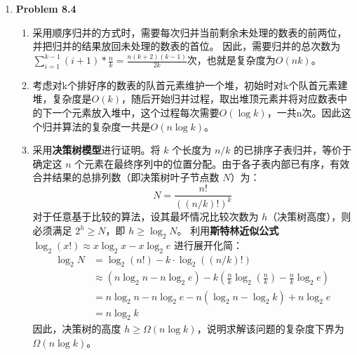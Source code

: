 \documentclass{ctexart}
\begin{document}
\begin{enumerate}[label=\arabic*.]
\begin{enumerate}[label=(\arabic*)]
\begin{algorithm}[H]
                $sum \leftarrow a_n$\;
                \Return $sum$\;
            \end{algorithm}
            \item 如果存在一个算法，其复杂度为$o(n)$，那么其必然不能遍历多项式的全部$n+1$项。那么我们就可以随意改动没遍历到的这一项的系数，使得这个算法无法输出正确的多项式的值。
                因此所有多项式求值算法的复杂度都是$\Omega(n)$。
        \end{enumerate}
    \item \textbf{Problem 8.4}
        \begin{enumerate}[label=(\arabic*)]
            \item 采用顺序归并的方式时，需要每次归并当前剩余未处理的数表的前两位，并把归并的结果放回未处理的数表的首位。
                因此，需要归并的总次数为$\sum_{i=1}^{k-1}{(i+1)*\frac{n}{k}}=\frac{n(k+2)(k-1)}{2k}$次，也就是复杂度为$O(nk)$。
            \item 考虑对k个排好序的数表的队首元素维护一个堆，初始时对k个队首元素建堆，复杂度是$O(k)$，随后开始归并过程，取出堆顶元素并将对应数表中的下一个元素放入堆中，这个过程每次需要$O(\log{k})$，一共n次。因此这个归并算法的复杂度一共是$O(n\log{k})$。
            \item 采用\textbf{决策树模型}进行证明。将 $k$ 个长度为 $n/k$ 的已排序子表归并，等价于确定这 $n$ 个元素在最终序列中的位置分配。由于各子表内部已有序，有效合并结果的总排列数（即决策树叶子节点数 $N$）为：
                $$ N = \frac{n!}{\left( (n/k)! \right)^k} $$
                对于任意基于比较的算法，设其最坏情况比较次数为 $h$（决策树高度），则必须满足 $2^h \ge N$，即 $h \ge \log_2 N$。
                利用\textbf{斯特林近似公式} $\log_2(x!) \approx x \log_2 x - x \log_2 e$ 进行展开化简：
                \begin{align*}
                \log_2 N &= \log_2(n!) - k \cdot \log_2\left( (n/k)! \right) \\
                &\approx (n \log_2 n - n \log_2 e) - k \left( \frac{n}{k} \log_2\left(\frac{n}{k}\right) - \frac{n}{k} \log_2 e \right) \\
                &= n \log_2 n - n \log_2 e - n (\log_2 n - \log_2 k) + n \log_2 e \\
                &= n \log_2 k
                \end{align*}
                因此，决策树的高度 $h \ge \Omega(n \log k)$，说明求解该问题的复杂度下界为 $\Omega(n \log k)$。

\end{enumerate}
\end{enumerate}
\end{document}
